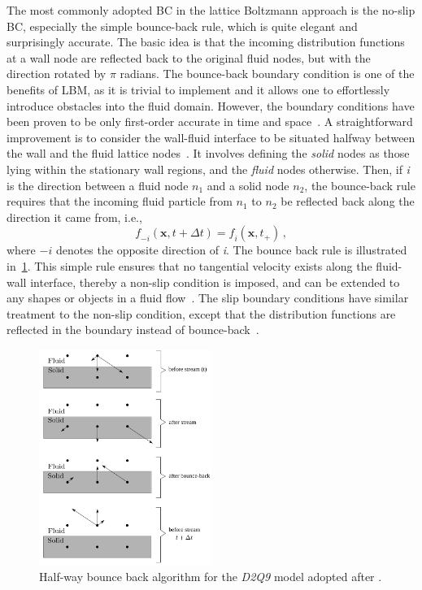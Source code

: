 The most commonly adopted BC in the lattice Boltzmann approach is the no-slip 
BC, especially the simple bounce-back rule, which is quite elegant and 
surprisingly accurate. The basic idea is that the incoming distribution 
functions at a wall node are reflected back to the original fluid nodes, but 
with the direction rotated by $\pi$ radians. The bounce-back boundary 
condition is one of the benefits of LBM, as it is trivial to implement and it 
allows one to effortlessly introduce obstacles into the fluid domain. However, 
the boundary conditions have been proven to be only first-order accurate in 
time and space~\citep{Pan2006}. A straightforward improvement is to 
consider the wall-fluid interface to be situated halfway between the wall and 
the fluid lattice nodes~\citep{Ziegler1993}. It involves defining the 
\textit{solid} nodes as those lying within the stationary wall regions, and the 
\textit{fluid} nodes otherwise. Then, if \textit{i} is the direction between a 
fluid node $\mathit{n}_{1}$ and a solid node $\mathit{n_2}$, the bounce-back 
rule requires that the incoming fluid particle from $\mathit{n}_{1}$ to 
$\mathit{n}_{2}$ be reflected back along the direction it came from, i.e.,
%
\begin{equation}
	\mathit{f}_{-\mathit{i}}(\mathbf{x}, \mathit{t}+\Delta \mathit{t}) = 
	\mathit{f_i}(\mathbf{x}, \mathit{t}_{+})\,,
\end{equation}
%
\noindent where $-\mathit{i}$ denotes the opposite direction of 
\textit{i}. The bounce back rule is illustrated 
in~\cref{fig:bounce}. This simple rule ensures that no 
tangential velocity exists along the fluid-wall interface, 
thereby a non-slip condition is imposed, and can be extended to 
any shapes or objects in a fluid flow~\citep{Han2007b,Zou1997}. 
The slip boundary conditions have similar treatment to the 
non-slip condition, except that the distribution functions are 
reflected in the boundary instead of 
bounce-back~\citep{Succi2001}.

\begin{figure}[htbp]
	\centering
	\includegraphics[width=0.5\textwidth]{bounce}
	\caption[Half-way bounce back algorithm for the \textit{D2Q9} model 
	]{Half-way 
	bounce back algorithm for the \textit{D2Q9} model adopted after 
	\citet{Sukop2006}.}
	\label{fig:bounce}
\end{figure}

